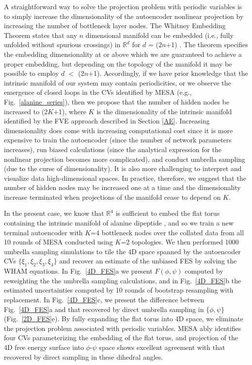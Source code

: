 \documentclass[12pt]{article}
\newcommand*{\blauw}[1]{#1}
\begin{document}
A straightforward way to solve the projection problem with periodic variables is to simply increase the dimensionality of the autoencoder nonlinear projection by increasing the number of bottleneck layer nodes. The Whitney Embedding Theorem states that any $n$ dimensional manifold can be embedded (i.e., fully unfolded without spurious crossings) in $\mathbb{R}^d$ for $d$ = (2$n$+1) \cite{whitney1936differentiable}. The theorem specifies the embedding dimensionality at or above which we are guaranteed to achieve a proper embedding, but depending on the topology of the manifold it may be possible to employ $d$ $<$  (2$n$+1). Accordingly, if we have prior knowledge that the intrinsic manifold of our system may contain periodicities, or we observe the emergence of closed loops in the CVs identified by MESA (e.g., \blauw{Fig.~\ref{alanine_series}}), then we propose that the number of hidden nodes be increased to (2$K$+1), where $K$ is the dimensionality of the intrinsic manifold identified by the FVE approach described in \blauw{Section \ref{AE}}. Increasing dimensionality does come with increasing computational cost since it is more expensive to train the autoencoder (since the number of network parameters increases), run biased calculations (since the analytical expression for the nonlinear projection becomes more complicated), and conduct umbrella sampling (due to the curse of dimensionality). It is also more challenging to interpret and visualize data high-dimensional spaces. In practice, therefore, we suggest that the number of hidden nodes may be increased one at a time and the dimensionality increase terminated when projections of the manifold cease to depend on $K$.

In the present case, we know that $\mathbb{R}^4$ is sufficient to embed the flat torus containing the intrinsic manifold of alanine dipeptide \cite{hashemian2015topological}, and so we train a new terminal autoencoder with $K$=4 bottleneck nodes over the collated data from all 10 rounds of MESA conducted using $K$=2 topologies. We then performed 1000 umbrella sampling simulations to tile the 4D space spanned by the autoencoder CVs $\{\xi_1,\xi_2,\xi_3,\xi_4\}$ and recover an estimate of the unbiased FES by solving the WHAM equations. In \blauw{Fig.~\ref{4D_FES}a} we present $F(\phi,\psi)$ computed by reweighting the the umbrella sampling calculations, and in \blauw{Fig.~\ref{4D_FES}b} the estimated uncertainties computed by 10 rounds of bootstrap resampling with replacement. In \blauw{Fig.~\ref{4D_FES}c}, we present the difference between \blauw{Fig.~\ref{4D_FES}a} and that recovered by direct umbrella sampling in $\{\phi,\psi\}$ (\blauw{Fig.~\ref{2D_FES}e}). By fully expanding the flat torus into 4D space, we eliminate the projection problem associated with periodic variables. MESA ably identifies four CVs parameterizing the embedding of the flat torus, and projection of the 4D free energy surface into $\phi$-$\psi$ space shows excellent agreement with that recovered by direct sampling in these dihedral angles.
\end{document}
